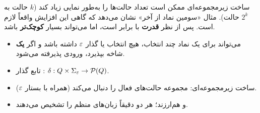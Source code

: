 \begin{note}
ساخت زیرمجموعه‌ای ممکن است تعداد حالت‌ها را به‌طور نمایی زیاد کند ($k$ حالت به $2^k$ حالت). مثال «سومین نماد از آخر» نشان می‌دهد که گاهی این افزایش واقعاً لازم است. پس  از نظر \textbf{قدرت} با  برابر است، اما می‌تواند بسیار \textbf{کوچک‌تر} باشد.
\end{note}

\begin{summary}
\begin{itemize}
\item {} می‌تواند برای یک نماد چند انتخاب، هیچ انتخاب یا گذار $\varepsilon$ داشته باشد و اگر \textbf{یک} شاخه بپذیرد، ورودی پذیرفته می‌شود.
\item تابع گذار : $\delta:Q\times\Sigma_\varepsilon\to\mathcal{P}(Q)$.
\item ساخت زیرمجموعه‌ای:  مجموعه حالت‌های فعال  را دنبال می‌کند (همراه با بستار $\varepsilon$).
\item {} و  هم‌ارزند؛ هر دو دقیقاً زبان‌های منظم را تشخیص می‌دهند.
\end{itemize}
\end{summary}
